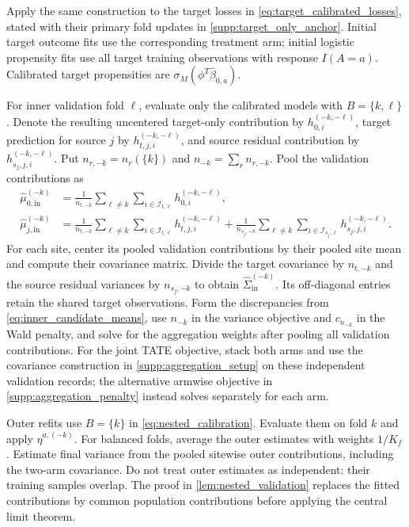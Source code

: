 \documentclass[12pt]{article}
\begin{document}
Apply the same construction to the target losses in \cref{eq:target_calibrated_losses}, stated with their primary fold updates in \cref{supp:target_only_anchor}. Initial target outcome fits use the corresponding treatment arm; initial logistic propensity fits use all target training observations with response $I(A=a)$. Calibrated target propensities are $\sigma_M(\phi^T\widehat\beta_{0,a})$.

For inner validation fold $\ell$, evaluate only the calibrated models with $B=\{k,\ell\}$. Denote the resulting uncentered target-only contribution by $h_{0,i}^{(-k,-\ell)}$, target prediction for source $j$ by $h_{t,j,i}^{(-k,-\ell)}$, and source residual contribution by $h_{s_j,j,i}^{(-k,-\ell)}$. Put $n_{r,-k}=n_r(\{k\})$ and $n_{-k}=\sum_r n_{r,-k}$. Pool the validation contributions as
\begin{equation}\label{eq:inner_candidate_means}
\begin{aligned}
\widehat\mu_{0,\mathrm{in}}^{(-k)}
&=\frac{1}{n_{t,-k}}\sum_{\ell\ne k}\sum_{i\in\mathcal I_{t,\ell}}h_{0,i}^{(-k,-\ell)},\\
\widehat\mu_{j,\mathrm{in}}^{(-k)}
&=\frac{1}{n_{t,-k}}\sum_{\ell\ne k}\sum_{i\in\mathcal I_{t,\ell}}h_{t,j,i}^{(-k,-\ell)}
+\frac{1}{n_{s_j,-k}}\sum_{\ell\ne k}\sum_{i\in\mathcal I_{s_j,\ell}}h_{s_j,j,i}^{(-k,-\ell)}.
\end{aligned}
\end{equation}
For each site, center its pooled validation contributions by their pooled site mean and compute their covariance matrix. Divide the target covariance by $n_{t,-k}$ and the source residual variances by $n_{s_j,-k}$ to obtain $\widehat\Sigma_{\mathrm{in}}^{(-k)}$. Its off-diagonal entries retain the shared target observations. Form the discrepancies from \cref{eq:inner_candidate_means}, use $n_{-k}$ in the variance objective and $c_{n_{-k}}$ in the Wald penalty, and solve for the aggregation weights after pooling all validation contributions. For the joint TATE objective, stack both arms and use the covariance construction in \cref{supp:aggregation_setup} on these independent validation records; the alternative armwise objective in \cref{supp:aggregation_penalty} instead solves separately for each arm.

Outer refits use $B=\{k\}$ in \cref{eq:nested_calibration}. Evaluate them on fold $k$ and apply $\widehat\eta^{a,(-k)}$. For balanced folds, average the outer estimates with weights $1/K_f$. Estimate final variance from the pooled sitewise outer contributions, including the two-arm covariance. Do not treat outer estimates as independent: their training samples overlap. The proof in \cref{lem:nested_validation} replaces the fitted contributions by common population contributions before applying the central limit theorem.
\end{document}
